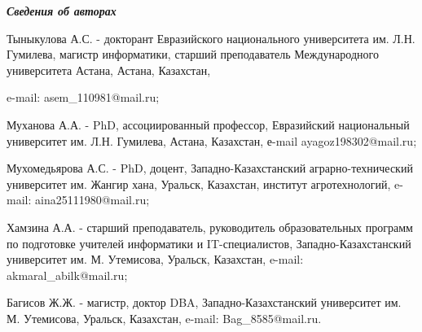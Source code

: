 \emph{{\bfseries Сведения об авторах}}

\begin{noparindent}
Тыныкулова А.С. - докторант Евразийского национального университета им.
Л.Н. Гумилева, магистр информатики, старший преподаватель Международного
университета Астана, Астана, Казахстан,

e-mail: asem\_110981@mail.ru;

Муханова А.А. - PhD, ассоциированный профессор, Евразийский национальный
университет им. Л.Н. Гумилева, Астана, Казахстан, е-mail
ayagoz198302@mail.ru;

Мухомедьярова А.С. - PhD, доцент, Западно-Казахстанский
аграрно-технический университет им. Жангир хана, Уральск, Казахстан,
институт агротехнологий, e-mail: aina25111980@mail.ru;

Хамзина А.А. - старший преподаватель, руководитель образовательных
программ по подготовке учителей информатики и IT-специалистов,
Западно-Казахстанский университет им. М. Утемисова, Уральск, Казахстан,
e-mail: akmaral\_abilk@mail.ru;

Багисов Ж.Ж. - магистр, доктор DBA, Западно-Казахстанский университет
им. М. Утемисова, Уральск, Казахстан, e-mail: Bag\_8585@mail.ru.
\end{noparindent}
